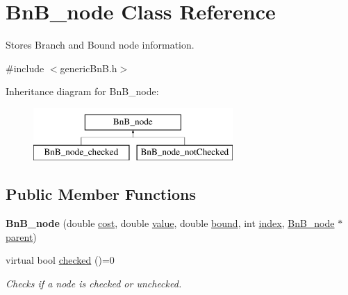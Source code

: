 \hypertarget{class_bn_b__node}{}\section{Bn\+B\+\_\+node Class Reference}
\label{class_bn_b__node}


Stores Branch and Bound node information.  




{\ttfamily \#include $<$generic\+Bn\+B.\+h$>$}

Inheritance diagram for Bn\+B\+\_\+node\+:\begin{figure}[H]
\begin{center}
\leavevmode
\includegraphics[height=2.000000cm]{class_bn_b__node}
\end{center}
\end{figure}
\subsection*{Public Member Functions}
\begin{DoxyCompactItemize}
\item 
\hypertarget{class_bn_b__node_a59c19a1a90773b24e175fc7ff2a5d7a5}{}{\bfseries Bn\+B\+\_\+node} (double \hyperlink{class_bn_b__node_a6a44afc83f3d0c1601804b61cf03fbf1}{cost}, double \hyperlink{class_bn_b__node_a726b74bbceb33532ee8678e0722d62aa}{value}, double \hyperlink{class_bn_b__node_a275b8c6f02b922e74a7f82d8fb3b5cf9}{bound}, int \hyperlink{class_bn_b__node_a531520424d5cc944a542a984cc14f32f}{index}, \hyperlink{class_bn_b__node}{Bn\+B\+\_\+node} $\ast$\hyperlink{class_bn_b__node_ac70c63a5ed68adefb9bc9540ac8e68dd}{parent})\label{class_bn_b__node_a59c19a1a90773b24e175fc7ff2a5d7a5}

\item 
virtual bool \hyperlink{class_bn_b__node_ae59aee037f8c7c88b9b63948e7b5d8cb}{checked} ()=0
\begin{DoxyCompactList}\small\item\em Checks if a node is checked or unchecked. \end{DoxyCompactList}\end{DoxyCompactItemize}

